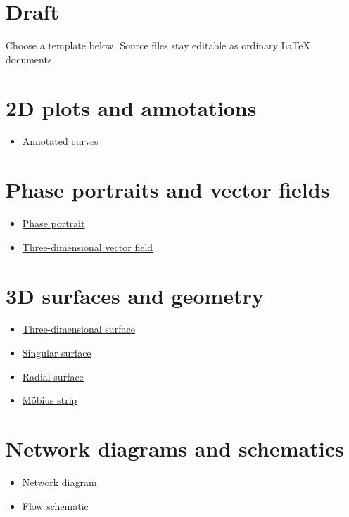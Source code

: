 \documentclass{article}
\begin{document}
\section{Draft}
Choose a template below. Source files stay editable as ordinary LaTeX documents.
\section{2D plots and annotations}
\begin{itemize}
  \item \href{templates/annotated-curves.tex}{Annotated curves}
\end{itemize}

\section{Phase portraits and vector fields}
\begin{itemize}
  \item \href{templates/phase-portrait.tex}{Phase portrait}
  \item \href{templates/vector-field-3d.tex}{Three-dimensional vector field}
\end{itemize}

\section{3D surfaces and geometry}
\begin{itemize}
  \item \href{templates/three-dimensional-surface.tex}{Three-dimensional surface}
  \item \href{templates/singular-surface.tex}{Singular surface}
  \item \href{templates/radial-surface.tex}{Radial surface}
  \item \href{templates/mobius-strip.tex}{Möbius strip}
\end{itemize}

\section{Network diagrams and schematics}
\begin{itemize}
  \item \href{templates/network-diagram.tex}{Network diagram}
  \item \href{templates/flow-schematic.tex}{Flow schematic}
\end{itemize}
\end{document}
